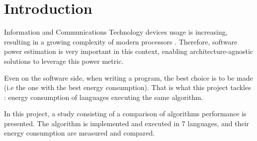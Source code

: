 \chapter*{Introduction}
	\thispagestyle{introduction}
	Information and Communications Technology devices usage is increasing, resulting in a growing complexity of modern processors \cite{ict}. Therefore, software power estimation is very important in this context, enabling architecture-agnostic solutions to leverage this power metric.
	 
	 Even on the software side, when writing a program, the best choice is to be made (i.e the one with the best energy consumption). That is what this project tackles : energy consumption of languages executing the same algorithm.
	 
	 In this project, a study consisting of a comparison of algorithms performance is presented. The algorithm is implemented and executed in 7 languages, and their energy consumption are measured and compared.